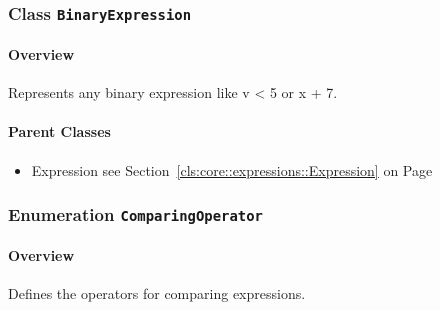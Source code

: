 \subsubsection{\Large{Class \bfseries \texttt{BinaryExpression}\normalfont}}
\label{cls:core::expressions::common::BinaryExpression} 
\paragraph{Overview}

	
			
Represents any binary expression like v < 5 or x + 7.	
		
	



\paragraph{Parent Classes}
\begin{itemize}
\item Expression see Section~\ref{cls:core::expressions::Expression} on Page~\pageref{cls:core::expressions::Expression}\end{itemize}
\subsubsection{\Large{Enumeration \bfseries \texttt{ComparingOperator}\normalfont}}
\label{cls:core::expressions::common::ComparingOperator} 
\paragraph{Overview}
	
			
Defines the operators for comparing expressions.	
		
	


